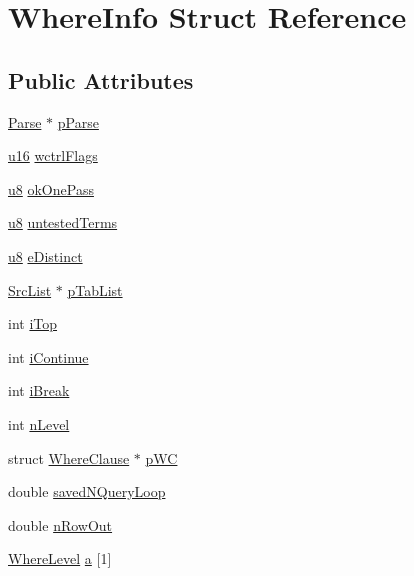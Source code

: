 \hypertarget{struct_where_info}{\section{Where\-Info Struct Reference}
\label{struct_where_info}
}
\subsection*{Public Attributes}
\begin{DoxyCompactItemize}
\item 
\hyperlink{struct_parse}{Parse} $\ast$ \hyperlink{struct_where_info_a26745055cd13360536fb4b074db358f9}{p\-Parse}
\item 
\hyperlink{sqlite3_8c_a20f2299e322dcbde37cb07b16910b843}{u16} \hyperlink{struct_where_info_a85ac59be7be01c6b08f8b225585d27e0}{wctrl\-Flags}
\item 
\hyperlink{sqlite3_8c_a74a0f6424ae628af25f23f0a35f6ead3}{u8} \hyperlink{struct_where_info_a851aa1747f940f6ab58505f9326fe9c7}{ok\-One\-Pass}
\item 
\hyperlink{sqlite3_8c_a74a0f6424ae628af25f23f0a35f6ead3}{u8} \hyperlink{struct_where_info_a4f925cad7a0a9ff977eef944969673d8}{untested\-Terms}
\item 
\hyperlink{sqlite3_8c_a74a0f6424ae628af25f23f0a35f6ead3}{u8} \hyperlink{struct_where_info_a3dd0b1738e0e2fbf5ab61c00939ab532}{e\-Distinct}
\item 
\hyperlink{struct_src_list}{Src\-List} $\ast$ \hyperlink{struct_where_info_a0f43432aeca75640c96a69f6a82aa138}{p\-Tab\-List}
\item 
int \hyperlink{struct_where_info_a4edc0a92a162cbe63ac8f52e923fb038}{i\-Top}
\item 
int \hyperlink{struct_where_info_a5b8eb73a6a5bba7ef126b9de13ee8537}{i\-Continue}
\item 
int \hyperlink{struct_where_info_a338ac73b84c81db455ad7db56b5e4a06}{i\-Break}
\item 
int \hyperlink{struct_where_info_ab04fa676e481a8df69107201a362c686}{n\-Level}
\item 
struct \hyperlink{struct_where_clause}{Where\-Clause} $\ast$ \hyperlink{struct_where_info_aad633b9e8b7ff4046fcfe798729c591a}{p\-W\-C}
\item 
double \hyperlink{struct_where_info_a42261b8c4fbc968e0096fa13ea4c00a7}{saved\-N\-Query\-Loop}
\item 
double \hyperlink{struct_where_info_aca7831db346643eddd5520c3bce4b7bb}{n\-Row\-Out}
\item 
\hyperlink{struct_where_level}{Where\-Level} \hyperlink{struct_where_info_a427337160cbeaf64b23a8241fb10dbf9}{a} \mbox{[}1\mbox{]}
\end{DoxyCompactItemize}


